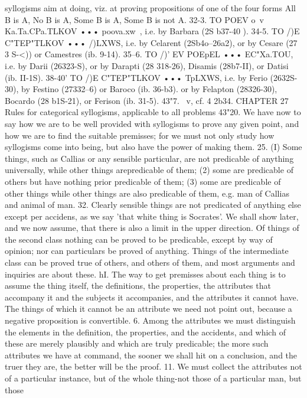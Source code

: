 {{{{{{{{{{{{{{{{{{{syllogisms aim at doing, viz. at proving propositions of one of the
four forms All B is A, No B is A, Some B is A, Some B is not A.
32-3. TO POEV o~v Ka.Ta.CPa.TLKOV ••• poova.xw~, i.e. by Barbara
(2S b37-40 ).
34-5. TO /)E C"TEP"TLKOV ••• /)LXWS, i.e. by Celarent (2Sb4o--26a2),
or by Cesare (27 3 S-<)) or Camestres (ib. 9-14).
35--6. TO /)' EV POEpEL ••• EC"Xa.TOU, i.e. by Darii (26323-S), or by
Darapti (28 318-26), Disamis (28b7-II), or Datisi (ib. II-1S).
38-40' TO /)E C"TEP"TLKOV ••• TpLXWS, i.e. by Ferio (2632S-30), by
Festino (27332--6) or Baroco (ib. 36-b3). or by Felapton (28326-30),
Bocardo (28 b1S-21), or Ferison (ib. 31-5).
43"7. ~v, cf. 4 2b34.
CHAPTER 27
Rules for categorical syllogisms, applicable to all problems
43"20. We have now to say how we are to be well provided with
syllogisms to prove any given point, and how we are to find the
suitable premisses; for we must not only study how syllogisms
come into being, but also have the power of making them.
25. (I) Some things, such as Callias or any sensible particular,
are not predicable of anything universally, while other things arepredicable of them; (2) some are predicable of others but have
nothing prior predicable of them; (3) some are predicable of other
things while other things are also predicable of them, e.g. man of
Callias and animal of man.
32. Clearly sensible things are not predicated of anything else
except per accidens, as we say 'that white thing is Socrates'. We
shall show later, and we now assume, that there is also a limit in
the upper direction. Of things of the second class nothing can be
proved to be predicable, except by way of opinion; nor can
particulars be proved of anything. Things of the intermediate
class can be proved true of others, and others of them, and most
arguments and inquiries are about these.
hI. The way to get premisses about each thing is to assume
the thing itself, the definitions, the properties, the attributes
that accompany it and the subjects it accompanies, and the
attributes it cannot have. The things of which it cannot be an
attribute we need not point out, because a negative proposition
is convertible.
6. Among the attributes we must distinguish the elements in
the definition, the properties, and the accidents, and which of
these are merely plausibly and which are truly predicable; the
more such attributes we have at command, the sooner we shall
hit on a conclusion, and the truer they are, the better will be the
proof.
11. We must collect the attributes not of a particular instance,
but of the whole thing-not those of a particular man, but those
}}}}}}}}}}}}}}}}}}}
